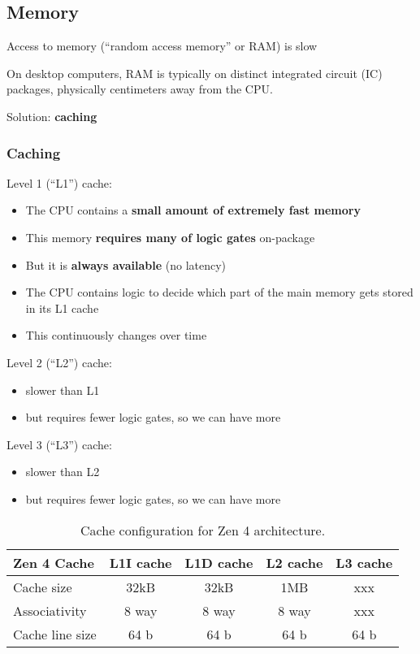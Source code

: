 \documentclass[12pt]{article}
\begin{document}
\subsection{Memory}

Access to memory (``random access memory'' or RAM) is slow

On desktop computers, RAM is typically on distinct integrated circuit (IC) packages,
physically centimeters away from the CPU.

Solution: \textbf{caching}

\subsubsection{Caching}

Level 1 (``L1'') cache:
\begin{itemize}
    \item The CPU contains a \textbf{small amount of extremely fast memory}
    \item This memory \textbf{requires many of logic gates} on-package
    \item But it is \textbf{always available} (no latency)
    \item The CPU contains logic to decide which part of the main memory gets stored in its L1 cache
    \item This continuously changes over time
\end{itemize}

Level 2 (``L2'') cache:
\begin{itemize}
    \item slower than L1
    \item but requires fewer logic gates, so we can have more
\end{itemize}

Level 3 (``L3'') cache:
\begin{itemize}
    \item slower than L2
    \item but requires fewer logic gates, so we can have more
\end{itemize}

\begin{table}[h!]
\centering
\begin{tabular}{|l|c|c|c|c|}
\hline
\textbf{Zen 4 Cache} & \textbf{L1I cache} & \textbf{L1D cache} & \textbf{L2 cache} & \textbf{L3 cache} \\ \hline
Cache size           & 32kB               & 32kB                & 1MB               & xxx               \\ \hline
Associativity        & 8 way              & 8 way               & 8 way             & xxx               \\ \hline
Cache line size      & 64 b               & 64 b                & 64 b              & 64 b              \\ \hline
\end{tabular}
\caption{Cache configuration for Zen 4 architecture.}
\label{table:zen4cache}
\end{table}
\end{document}
